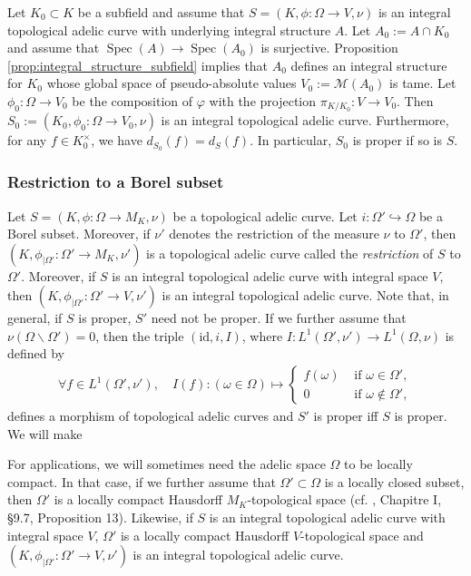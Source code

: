 \documentclass [11pt,reqno]{amsart}
\newcommand{\1}{\mathmybb{1}}
\def\cM{{\mathcal{M}}}
\def\Spec{\operatorname{Spec}}
\def\setminus{\smallsetminus}
\begin{document}
\begin{definition}
\label{def:restriction_subfield}
Let $K_0\subset K$ be a subfield and assume that $S=(K,\phi:\Omega\to V,\nu)$ is an integral topological adelic curve with underlying integral structure $A$. Let $A_0:=A\cap K_0$ and assume that $\Spec(A)\to \Spec(A_0)$ is surjective. Proposition \ref{prop:integral_structure_subfield} implies that $A_0$ defines an integral structure for $K_0$ whose global space of pseudo-absolute values $V_0 := \cM(A_0)$ is tame. Let $\phi_0 : \Omega \to V_0$ be the composition of $\varphi$ with the projection $\pi_{K/K_0} : V \to V_0$. Then $S_0 :=(K_0, \phi_0:\Omega\to V_0,\nu)$ is an integral topological adelic curve. Furthermore, for any $f\in K_0^{\times}$, we have $d_{S_0}(f) = d_S(f)$. In particular, $S_0$ is proper if so is $S$.
\end{definition}

\subsubsection{Restriction to a Borel subset}
\label{subsub:restriction_adelic_structure}

Let $S=(K,\phi:\Omega\to M_K,\nu)$ be a topological adelic curve. Let $i:\Omega'\hookrightarrow \Omega$ be a Borel subset. Moreover, if $\nu'$ denotes the restriction of the measure $\nu$ to $\Omega'$, then $(K,\phi_{|\Omega'}:\Omega'\to M_{K},\nu')$ is a topological adelic curve called the \emph{restriction} of $S$ to $\Omega'$. Moreover, if $S$ is an integral topological adelic curve with integral space $V$, then $(K,\phi_{|\Omega'}:\Omega'\to V,\nu')$ is an integral topological adelic curve. Note that, in general, if $S$ is proper, $S'$ need not be proper. If we further assume that $\nu(\Omega\setminus\Omega')=0$, then the triple $(\mathrm{id},i,I)$, where $I:L^{1}(\Omega',\nu')\to L^{1}(\Omega,\nu)$ is defined by
\begin{align*}
\forall f\in L^{1}(\Omega',\nu'), \quad I(f) : (\omega\in\Omega) \mapsto  \left\{\begin{matrix}
f(\omega) &\text{ if }\omega\in\Omega',\\
0 &\text{ if }\omega\notin\Omega',
\end{matrix}\right.
\end{align*}
defines a morphism of topological adelic curves and $S'$ is proper iff $S$ is proper. We will make 

\begin{remark}
\label{rem:restriction_adelic_structure_locally_compact}
For applications, we will sometimes need the adelic space $\Omega$ to be locally compact. In that case, if we further assume that $\Omega'\subset \Omega$ is a locally closed subset, then $\Omega'$ is a locally compact Hausdorff $M_K$-topological space (cf. \cite{BouTG},  Chapitre I, \S 9.7, Proposition 13).  Likewise, if $S$ is an integral topological adelic curve with integral space $V$, $\Omega'$ is a locally compact Hausdorff $V$-topological space and $(K,\phi_{|\Omega'}:\Omega' \to V,\nu')$ is an integral topological adelic curve.
\end{remark}
\end{document}
